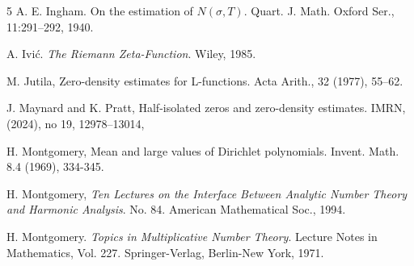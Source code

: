 \documentclass{amsart}
\theoremstyle{plain}
\numberwithin{equation}{section}
\begin{document}
\begin{thebibliography}{5}
 A. E. Ingham. On the estimation of $N (\sigma , T )$. Quart. J. Math. Oxford Ser., 11:291–292, 1940.

 A. Ivi\'c. {\it The Riemann Zeta-Function}. Wiley, 1985.


 M. Jutila, Zero-density estimates for L-functions. Acta Arith., 32 (1977), 55–62.

 J. Maynard and K. Pratt, Half-isolated zeros and zero-density estimates. IMRN, (2024), no 19, 12978–13014,

 H. Montgomery,  Mean and large values of Dirichlet polynomials. Invent. Math. 8.4 (1969), 334-345.

 H. Montgomery,  {\it Ten Lectures on the Interface Between Analytic Number Theory and Harmonic Analysis}. No. 84. American Mathematical Soc., 1994.

 H. Montgomery. {\it Topics in Multiplicative Number Theory}. Lecture Notes in Mathematics, Vol. 227.
Springer-Verlag, Berlin-New York, 1971.

%
\end{thebibliography}
\end{document}

